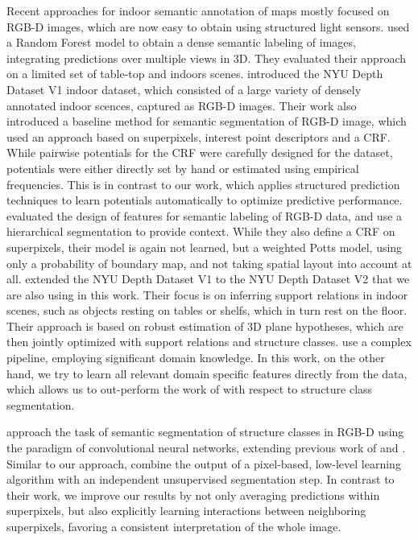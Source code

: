 \documentclass[a4paper, 10pt, conference]{ieeeconf}      %
\begin{document}
Recent approaches for indoor semantic annotation of maps mostly focused on
RGB-D images, which are now easy to obtain using structured light sensors.
\citet{stuckler2012semantic} used a Random Forest model to obtain a dense
semantic labeling of images, integrating predictions over multiple views in 3D.
They evaluated their approach on a limited set of table-top and indoors scenes.
%
\citep{silberman2011indoor} introduced the NYU Depth Dataset V1 indoor dataset,
which consisted of a large variety of densely annotated indoor scences, captured as RGB-D images.
Their work also introduced a baseline method for semantic segmentation of RGB-D
image, which used an approach based on superpixels, interest point descriptors
and a CRF.
While pairwise potentials for the CRF were carefully
designed for the dataset, potentials were either directly set by hand or estimated using empirical
frequencies. This is in contrast to our work, which applies structured prediction techniques
to learn potentials automatically to optimize predictive performance.
%
\citet{ren2012rgb} evaluated the design of features for semantic labeling of RGB-D data, and use
a hierarchical segmentation to provide context. While they also define a CRF on superpixels,
their model is again not learned, but a weighted Potts model, using only a
probability of boundary map, and not taking spatial layout into account at all.
%
\citet{SilbermanECCV12} extended the NYU Depth Dataset V1 to the NYU Depth Dataset V2 that we are also
using in this work.  Their focus is on inferring support relations in indoor
scenes, such as objects resting on tables or shelfs, which in turn rest on the floor.
Their approach is based on robust estimation of 3D plane hypotheses, which are then jointly
optimized with support relations and structure classes.
\citet{SilbermanECCV12} use a complex pipeline, employing significant domain knowledge.
In this work, on the other hand, we try to learn all relevant domain specific features
directly from the data, which allows us to out-perform the work of \citet{SilbermanECCV12}
with respect to structure class segmentation.

\citet{couprie-iclr-13} approach the task of semantic segmentation of structure classes
in RGB-D using the paradigm of convolutional neural networks, extending
previous work of \citet{farabet-pami-13} and \citet{schulz2012learning}.
Similar to our approach, \citet{couprie-iclr-13} combine the output of a
pixel-based, low-level learning algorithm with an independent unsupervised
segmentation step. In contrast to their work, we improve our results by not
only averaging predictions within superpixels, but also explicitly learning
interactions between neighboring superpixels, favoring a consistent
interpretation of the whole image.
\end{document}
